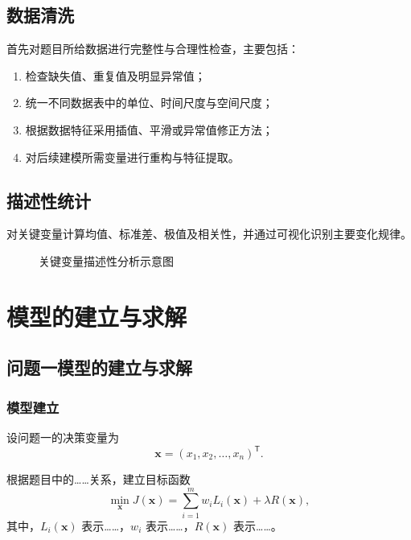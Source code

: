 \documentclass[UTF8,fontset=none,a4paper,12pt]{ctexart}
\begin{document}
\subsection{数据清洗}

首先对题目所给数据进行完整性与合理性检查，主要包括：
\begin{enumerate}
  \item 检查缺失值、重复值及明显异常值；
  \item 统一不同数据表中的单位、时间尺度与空间尺度；
  \item 根据数据特征采用插值、平滑或异常值修正方法；
  \item 对后续建模所需变量进行重构与特征提取。
\end{enumerate}

\subsection{描述性统计}

对关键变量计算均值、标准差、极值及相关性，并通过可视化识别主要变化规律。

\begin{figure}[H]
  \centering
  \fbox{\rule{0pt}{4.5cm}\rule{0.78\textwidth}{0pt}}
  \caption{关键变量描述性分析示意图}
  \label{fig:eda}
\end{figure}


\section{模型的建立与求解}

\subsection{问题一模型的建立与求解}

\subsubsection{模型建立}

设问题一的决策变量为
\[
\bm{x}=(x_1,x_2,\ldots,x_n)^\mathsf{T}.
\]

根据题目中的……关系，建立目标函数
\begin{equation}
  \min_{\bm{x}} J(\bm{x})
  = \sum_{i=1}^{m} w_i L_i(\bm{x})
  + \lambda R(\bm{x}),
  \label{eq:q1-objective}
\end{equation}
其中，$L_i(\bm{x})$ 表示……，$w_i$ 表示……，$R(\bm{x})$ 表示……。
\end{document}

